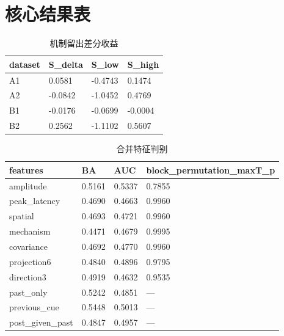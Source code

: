 \documentclass[UTF8,a4paper,11pt]{ctexart}
\begin{document}
\section{核心结果表}

\begin{longtable}{llll}

\caption{机制留出差分收益}\\\toprule

dataset & S\_delta & S\_low & S\_high\\\midrule

A1 & 0.0581 & -0.4743 & 0.1474\\

A2 & -0.0842 & -1.0452 & 0.4769\\

B1 & -0.0176 & -0.0699 & -0.0004\\

B2 & 0.2562 & -1.1102 & 0.5607\\

\bottomrule\end{longtable}

\begin{longtable}{llll}

\caption{合并特征判别}\\\toprule

features & BA & AUC & block\_permutation\_maxT\_p\\\midrule

amplitude & 0.5161 & 0.5337 & 0.7855\\

peak\_latency & 0.4690 & 0.4663 & 0.9960\\

spatial & 0.4693 & 0.4721 & 0.9960\\

mechanism & 0.4471 & 0.4679 & 0.9995\\

covariance & 0.4692 & 0.4770 & 0.9960\\

projection6 & 0.4840 & 0.4896 & 0.9795\\

direction3 & 0.4919 & 0.4632 & 0.9535\\

past\_only & 0.5242 & 0.4851 & —\\

previous\_cue & 0.5448 & 0.5013 & —\\

post\_given\_past & 0.4847 & 0.4957 & —\\

\bottomrule\end{longtable}
\end{document}
